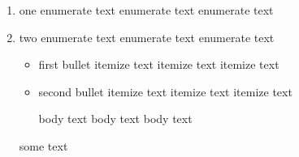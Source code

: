 \begin{enumerate}
	\item one
	      enumerate text
	      enumerate text
	      enumerate text
	\item two
	      enumerate text
	      enumerate text
	      enumerate text
	      \begin{itemize}
		      \item first bullet
		            itemize text
		            itemize text
		            itemize text
		      \item second bullet
		            itemize text
		            itemize text
		            itemize text
		            \begin{myenv}
			            body text
			            body text
			            body text
		            \end{myenv}
	      \end{itemize}
	      some text
\end{enumerate}
